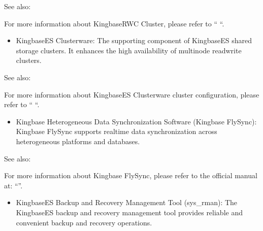 \documentclass[letterpaper,10pt,english]{sphinxmanual}
\begin{document}
\begin{sphinxseealso}{See also:}

\sphinxAtStartPar
For more information about KingbaseRWC Cluster, please refer to “  “.


\end{sphinxseealso}

\begin{itemize}
\item {} 
\sphinxAtStartPar
KingbaseES Clusterware:
The supporting component of KingbaseES shared storage clusters. It enhances the high availability of multi\sphinxhyphen{}node read\sphinxhyphen{}write clusters.

\end{itemize}


\begin{sphinxseealso}{See also:}

\sphinxAtStartPar
For more information about KingbaseES Clusterware cluster configuration, please refer to “  “.


\end{sphinxseealso}

\begin{itemize}
\item {} 
\sphinxAtStartPar
Kingbase Heterogeneous Data Synchronization Software (Kingbase FlySync):
Kingbase FlySync supports real\sphinxhyphen{}time data synchronization across heterogeneous platforms and databases.

\end{itemize}


\begin{sphinxseealso}{See also:}

\sphinxAtStartPar
For more information about Kingbase FlySync, please refer to the official manual at: “”.


\end{sphinxseealso}

\begin{itemize}
\item {} 
\sphinxAtStartPar
KingbaseES Backup and Recovery Management Tool (sys\_rman):
The KingbaseES backup and recovery management tool provides reliable and convenient backup and recovery operations.

\end{itemize}
\end{document}
